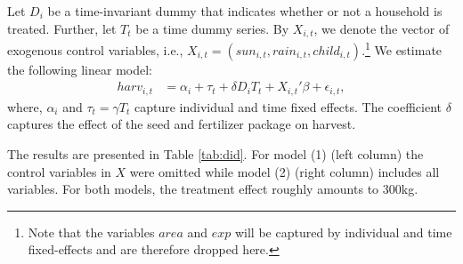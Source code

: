 
Let $D_i$ be a time-invariant dummy that indicates whether or not a household is treated. Further, let $T_t$ be a time dummy series. By $X_{i,t}$, we denote the vector of exogenous control variables, i.e., $X_{i,t} = \left(sun_{i,t}, rain_{i,t}, child_{i,t}\right)$.\footnote{Note that the variables $area$ and $exp$ will be captured by individual and time fixed-effects and are therefore dropped here.}
We estimate the following linear model:
\begin{align}
	\label{eq:eq7did}
	harv_{i,t} &= \alpha_i + \tau_t + \delta D_{i} T_t + X_{i,t}'\beta + \epsilon_{i,t},
\end{align}
where, $\alpha_i$ and $\tau_t = \gamma T_t$ capture individual and time fixed effects. The coefficient $\delta$ captures the effect of the seed and fertilizer package on harvest. 

The results are presented in Table \ref{tab:did}. For model (1) (left column) the control variables in $X$ were omitted while model (2) (right column) includes all variables. For both models, the treatment effect roughly amounts to 300kg.

